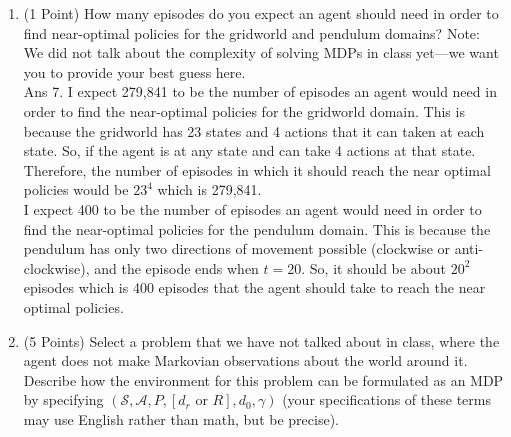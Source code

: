 \documentclass[]{article}
\begin{document}
\begin{enumerate}
{which the initial angle of the pendulum is chosen uniformly randomly in [- $\pi$, $\pi$] and the initial velocity is zero.
	}
    
    \item (1 Point)  How many episodes do you expect an agent should need in order to find near-optimal policies for the gridworld and pendulum domains? 
    Note: We did not talk about the complexity of solving MDPs in class yet---we want you to provide your best guess here. 
    \\

	{
		\color{blue}
			Ans 7. I expect 279,841 to be the number of episodes an agent would need in order to find the near-optimal policies for the gridworld domain. This is because the gridworld has 23 states and 4 actions that it can taken at each state. So, if the agent is at any state and can take 4 actions at that state. Therefore, the number of episodes in which it should reach the near optimal policies would be $23^4$ which is 279,841. \\
			I expect 400 to be the number of episodes an agent would need in order to find the near-optimal policies for the pendulum domain. This is because the pendulum has only two directions of movement possible (clockwise or anti-clockwise), and the episode ends when $t = 20$. So, it should be about $20^2$ episodes which is 400 episodes that the agent should take to reach the near optimal policies.
	}
    
    \item (5 Points) Select a problem that we have not talked about in class, where the agent does not make Markovian observations about the world around it. Describe how the environment for this problem can be formulated as an MDP by specifying $(\mathcal S, \mathcal A, P, [d_r\text{ or } R], d_0, \gamma)$ (your specifications of these terms may use English rather than math, but be precise). 


\end{enumerate}
\end{document}
